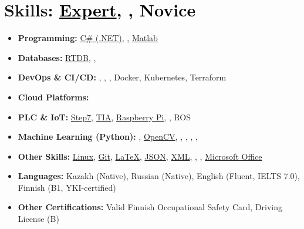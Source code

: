 \documentclass[a4paper,10pt]{article}
\begin{document}
\section*{Skills: \small\textcolor{black}{\uline{Expert}, , Novice}}
\begin{itemize}
    \item \textbf{Programming:} 
      \uline{C\# (.NET)}, 
      , 
      \uline{Matlab}
    \item \textbf{Databases:} 
      \uline{RTDB},
      , 
    \item \textbf{DevOps \& CI/CD:} 
      , 
      , 
      , 
      Docker, 
      Kubernetes, 
      Terraform
    \item \textbf{Cloud Platforms:} 
    \item \textbf{PLC \& IoT:} 
      \uline{Step7}, 
      \uline{TIA}, 
      \uline{Raspberry Pi}, 
      ,
      ROS
    \item \textbf{Machine Learning (Python):} 
      , 
      \uline{OpenCV}, 
      , 
      , 
      , 
      , 
    \item \textbf{Other Skills:} 
      \uline{Linux}, 
      \uline{Git}, 
      \uline{LaTeX}, 
      \uline{JSON}, 
      \uline{XML}, 
      ,
      ,
      \uline{Microsoft Office}
    \item \textbf{Languages:} Kazakh (Native), Russian (Native), English (Fluent, IELTS 7.0), Finnish (B1, YKI-certified)
    \item \textbf{Other Certifications:} Valid Finnish Occupational Safety Card, Driving License (B)
\end{itemize}
\end{document}
